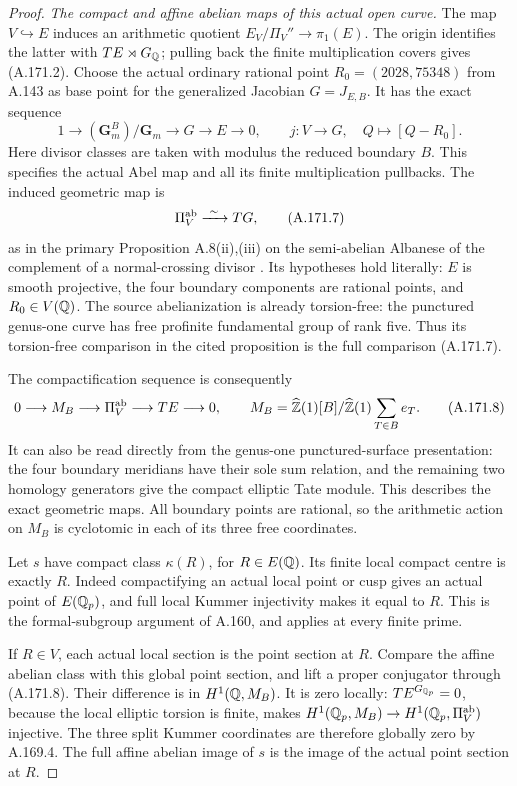 \begin{proof}
\emph{The compact and affine abelian maps of this actual open curve.}
The map \(V\hookrightarrow E\) induces an arithmetic quotient
\(E_V/\Pi_V''\to\pi_1(E)\).  The origin identifies the latter
with \(TE\rtimes G_\mathbb Q\); pulling back the finite multiplication
covers gives (A.171.2).  Choose the actual ordinary rational point
\(R_0=(2028,75348)\) from A.143 as base point for the generalized
Jacobian \(G=J_{E,B}\).  It has the exact sequence
\[
 1\longrightarrow (\mathbf G_m^B)/\mathbf G_m
        \longrightarrow G\longrightarrow E\longrightarrow0,
          \qquad j:V\longrightarrow G,\quad Q\longmapsto[Q-R_0].
\tag{A.171.6}
\]
Here divisor classes are taken with modulus the reduced boundary
\(B\).  This specifies the actual Abel map and all its finite
multiplication pullbacks.  The induced geometric map is
\[
                  \Pi_V^{\rm ab}\xrightarrow{\ \sim\ }TG,
\tag{A.171.7}
\]
as in the primary Proposition A.8(ii),(iii) on the semi-abelian
Albanese of the complement of a normal-crossing divisor
\cite[Proposition A.8(ii),(iii), pp.~232--234]{BIR_MochizukiAlbanese2012}.
Its hypotheses hold literally: \(E\) is smooth projective,
the four boundary components are rational points, and \(R_0\in V(\mathbb Q)\).
The source abelianization is already torsion-free: the punctured
genus-one curve has free profinite fundamental group of rank five.
Thus its torsion-free comparison in the cited proposition is the
full comparison (A.171.7).

The compactification sequence is consequently
\[
 0\longrightarrow M_B\longrightarrow\Pi_V^{\rm ab}
          \longrightarrow TE\longrightarrow0,
        \qquad M_B=\widehat{\mathbb Z}(1)[B]/\widehat{\mathbb Z}(1)\sum_{T\in B}e_T.
\tag{A.171.8}
\]
It can also be read directly from the genus-one punctured-surface
presentation: the four boundary meridians have their sole sum
relation, and the remaining two homology generators give the
compact elliptic Tate module.  This describes the exact geometric
maps.  All boundary points are rational, so the arithmetic action
on \(M_B\) is cyclotomic in each of its three free coordinates.

Let \(s\) have compact class \(\kappa(R)\), for
\(R\in E(\mathbb Q)\).  Its finite local compact centre is exactly
\(R\).  Indeed compactifying an actual local point or cusp gives
an actual point of \(E(\mathbb Q_p)\), and full local Kummer
injectivity makes it equal to \(R\).  This is the formal-subgroup
argument of A.160, and applies at every finite prime.

If \(R\in V\), each actual local section is the point section
at \(R\).  Compare the affine abelian class with this global
point section, and lift a proper conjugator through (A.171.8).
Their difference is in \(H^1(\mathbb Q,M_B)\).  It is zero locally:
\(TE^{G_{\mathbb Q_p}}=0\), because the local elliptic torsion is
finite, makes \(H^1(\mathbb Q_p,M_B)\to H^1(\mathbb Q_p,\Pi_V^{\rm ab})\)
injective.  The three split Kummer coordinates are therefore
globally zero by A.169.4.  The full affine abelian image of \(s\)
is the image of the actual point section at \(R\).


\end{proof}
